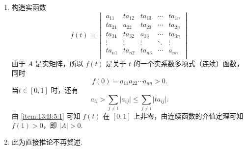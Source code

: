 \begin{enumerate}
\begin{enumerate}
              \item 构造实函数
                    \[f(t) = \begin{vmatrix}
                            a_{11}  & ta_{12} & ta_{13} & \cdots & ta_{1n} \\
                            ta_{21} & a_{22}  & ta_{23} & \cdots & ta_{2n} \\
                            ta_{31} & ta_{32} & a_{33}  & \cdots & ta_{3n} \\
                            \vdots  & \vdots  & \vdots  & \ddots & \vdots  \\
                            ta_{n1} & ta_{n2} & ta_{n3} & \cdots & a_{nn}  \\
                        \end{vmatrix}\]
                    由于 $A$ 是实矩阵，所以 $f(t)$ 是关于 $t$ 的一个实系数多项式（连续）函数，同时
                    \[f(0) = a_{11}a_{22}\cdots a_{nn} > 0.\] 当$t \in [0, 1]$ 时，还有
                    \[a_{ii} > \sum_{j \neq i} \lvert a_{ij} \rvert \leqslant \sum_{j \neq i} \lvert ta_{ij} \rvert.\]
                    由 \ref*{item:13:B:5:1} 可知 $f(t)$ 在 $[0, 1]$ 上非零，由连续函数的介值定理可知 $f(1) > 0$，即 $\lvert A \rvert > 0$.

              \item 此为直接推论不再赘述.
          \end{enumerate}


\end{enumerate}
